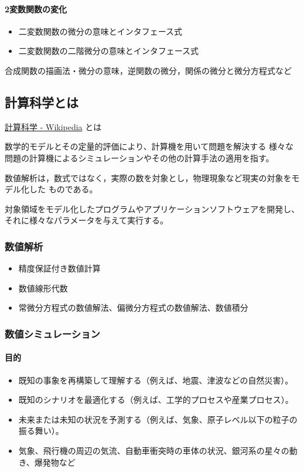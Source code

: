 \documentclass[dvipdfmx,11pat]{jarticle}
\begin{document}
\paragraph{2変数関数の変化}
\label{sec:org7bfd2bb}
\begin{itemize}
\item 二変数関数の微分の意味とインタフェース式
\item 二変数関数の二階微分の意味とインタフェース式
\end{itemize}

合成関数の描画法・微分の意味，逆関数の微分，関係の微分と微分方程式など
\subsection{計算科学とは}
\label{sec:org3d06453}

\href{https://ja.wikipedia.org/wiki/\%E8\%A8\%88\%E7\%AE\%97\%E7\%A7\%91\%E5\%AD\%A6}{計算科学 - Wikipedia} とは

数学的モデルとその定量的評価により、計算機を用いて問題を解決する
様々な問題の計算機によるシミュレーションやその他の計算手法の適用を指す。


数値解析は，数式ではなく，実際の数を対象とし，物理現象など現実の対象をモデル化した
ものである。

対象領域をモデル化したプログラムやアプリケーションソフトウェアを開発し、
それに様々なパラメータを与えて実行する。
\subsubsection{数値解析}
\label{sec:orga762ece}
\begin{itemize}
\item 精度保証付き数値計算
\item 数値線形代数
\item 常微分方程式の数値解法、偏微分方程式の数値解法、数値積分
\end{itemize}
\subsubsection{数値シミュレーション}
\label{sec:org55417f3}
\paragraph{目的}
\label{sec:org51d74bc}
\begin{itemize}
\item 既知の事象を再構築して理解する（例えば、地震、津波などの自然災害）。
\item 既知のシナリオを最適化する（例えば、工学的プロセスや産業プロセス）。
\item 未来または未知の状況を予測する（例えば、気象、原子レベル以下の粒子の振る舞い）。
\item 気象、飛行機の周辺の気流、自動車衝突時の車体の状況、銀河系の星々の動き、爆発物など
\end{itemize}
\end{document}
